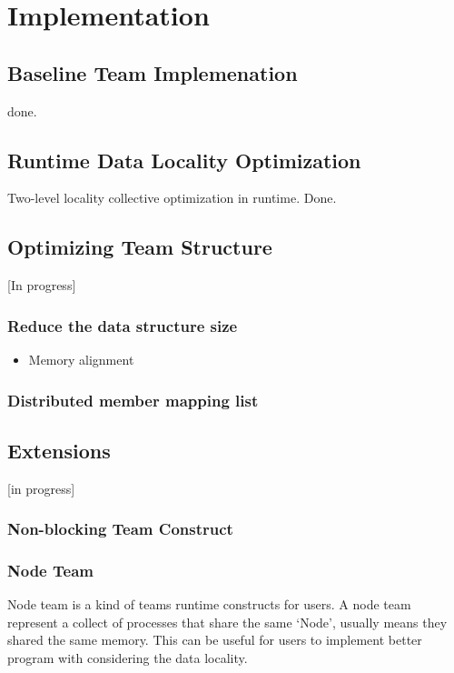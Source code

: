 \chapter{Implementation}\label{chap:Algorithms}
\section{Baseline Team Implemenation} 
done.
\section{Runtime Data Locality Optimization}
Two-level locality collective optimization in runtime. Done. 

\section{Optimizing Team Structure}
[In progress]
\subsection{Reduce the data structure size}
\begin{itemize}
\item Memory alignment
\end{itemize}
\subsection{Distributed member mapping list}

\section{Extensions}
[in progress]
\subsection{Non-blocking Team Construct}
\subsection{Node Team}
Node team is a kind of teams runtime constructs for users. A node team represent a collect of processes that share the same `Node', usually means they shared the same memory. This can be useful for users to implement better program with considering the data locality. 
